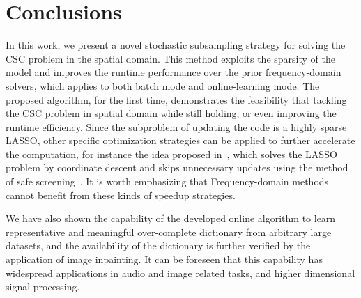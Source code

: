 \section{Conclusions}
In this work, we present a novel stochastic subsampling strategy for
solving the CSC problem in the spatial domain. This method exploits 
the sparsity of the  model and improves the runtime performance over the prior
frequency-domain solvers, which applies to both batch mode and
online-learning mode.  The proposed algorithm, for the first time,
demonstrates the feasibility that tackling the CSC problem in spatial
domain while still holding, or even improving the runtime
efficiency. Since the subproblem of updating the code is a highly
sparse LASSO, other specific optimization strategies can be applied to
further accelerate the computation, for instance the idea proposed
in~\cite{johnson2017stingycd}, which solves the LASSO problem by
coordinate descent and skips unnecessary updates using the method of
safe screening~\cite{ghaoui2012Swfe}. It is worth emphasizing that
Frequency-domain methods cannot benefit from these kinds of speedup
strategies.


We have also shown the capability of the developed online algorithm to
learn representative and meaningful over-complete dictionary from
arbitrary large datasets, and the availability of the dictionary is
further verified by the application of image inpainting. It can be
foreseen that this capability has widespread applications in audio
and image related tasks, and higher dimensional signal processing.



